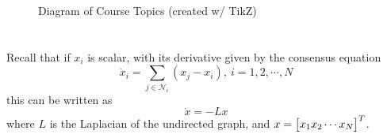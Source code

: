 \documentclass[]{article}
\numberwithin{equation}{section}
\begin{document}
\begin{figure}[h]
{\begin{tikzpicture}





		

	\end{tikzpicture}}
	\caption{Diagram of Course Topics (created w/ TikZ)}
	\label{fig:pblm1}
\end{figure}

\newpage
\section{}
Recall that if $x_i$ is scalar, with its derivative given by the consensus equation \[
    \dot{x}_i = \sum_{j \in \mathcal{N}_i} (x_j - x_i), \ i = 1, 2, \cdots, N
\] this can be written as \[
    \dot{x} = - L x
\] where $L$ is the Laplacian of the undirected graph, 
and $x = \mqty[x_1 x_2 \cdots x_N]^T$.
\end{document}
